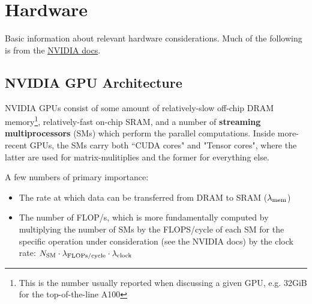 \documentclass[11pt]{article}
\begin{document}
\section{Hardware}

Basic information about relevant hardware considerations. Much of the following is from the
\href{https://docs.nvidia.com/deeplearning/performance/dl-performance-gpu-background/index.html}{NVIDIA
	docs}.



\subsection{NVIDIA GPU Architecture}

NVIDIA GPUs consist of some amount of relatively-slow off-chip DRAM memory\footnote{This is the number usually reported when
	discussing a given GPU, e.g. 32GiB for the top-of-the-line A100}, relatively-fast on-chip SRAM, and
a number of \textbf{streaming multiprocessors} (SMs) which perform the parallel computations.  Inside
more-recent GPUs, the SMs carry both ``CUDA cores" and "Tensor cores", where the latter are used for matrix-mulitiplies
and the former for everything else.


A few numbers of primary importance:
\begin{itemize}
	\item The rate at which data can be transferred from DRAM to SRAM ($ \lambda _{ {\rm mem} } $)
	\item The number of FLOP/s, which is more fundamentally computed by multiplying the number of
	      SMs by the FLOPS/cycle of each SM for the specific operation under consideration (see the NVIDIA
	      docs) by the clock rate: $ N _{ {\rm SM} }\cdot  \lambda _{ {\rm FLOPs/cycle} }\cdot  \lambda _{
			      {\rm clock} } $
\end{itemize}
\end{document}
